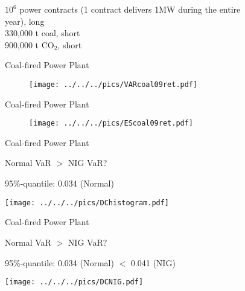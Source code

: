 \begin{figure}[htp]
$10^{6}$ power contracts (1 contract delivers 1MW during the entire
year), long \\[-1.5cm] 

330,000 t coal, short\\[-1.5cm] 

900,000 t CO$_{2}$, short 

Coal-fired Power Plant %
\begin{figure}


\centering{}\texttt{[image: ../../../pics/VARcoal09ret.pdf]} 
\end{figure}


Coal-fired Power Plant %
\begin{figure}
\centering{}\texttt{[image: ../../../pics/EScoal09ret.pdf]}
\end{figure}


Coal-fired Power Plant %


\begin{center}
Normal VaR $>$ NIG VaR? 
\par\end{center}

95\%-quantile: \hspace{2cm} 0.034 (Normal) \hspace{1cm}\\


\begin{center}
\texttt{[image: ../../../pics/DChistogram.pdf]} 
\par\end{center}

Coal-fired Power Plant %


\begin{center}
Normal VaR $>$ NIG VaR? 
\par\end{center}

95\%-quantile: \hspace{1cm} 0.034 (Normal) \hspace{1cm}$<$ \hspace{1cm}
0.041 (NIG)\\


\begin{center}
\texttt{[image: ../../../pics/DCNIG.pdf]} 
\par\end{center}


\end{figure}
